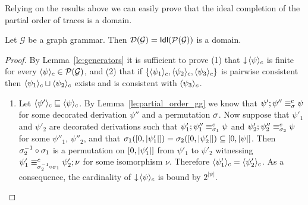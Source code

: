 Relying on the results above we can easily prove that the ideal
completion of the partial order of traces is a domain.

\begin{proposition} 
  \label{pr:domain-gg} 
  Let $\mathcal{G}$ be a graph grammar. Then
  $\dom{\mathcal{G}} =  \ideal{\poset{\mathcal{G}}}$
  is a
  domain.
\end{proposition}

\begin{proof}
  By Lemma~\ref{le:generators}
  it is sufficient to prove 
  (1) that
  $\principal{\ltrace{\psi}}$ is finite for every $\ltrace{\psi} \in
  \poset{\mathcal{G}}$, and (2) that if $\{\ltrace{\psi_1},
  \ltrace{\psi_2},
  \ltrace{\psi_3}\}$ is pairwise consistent then $\ltrace{\psi_1}
  \sqcup
  \ltrace{\psi_2}$ exists and is consistent with $\ltrace{\psi_3}$.


  
  \begin{enumerate}
  
  \item Let $\ltrace{\psi'} \sqsubseteq \ltrace{\psi}$. By
    Lemma~\ref{le:partial_order_gg}
    we know that
    $\psi';\psi'' \equiv^c_{\perm} \psi$ for some decorated derivation
    $\psi''$ and a
    permutation $\perm$.  Now suppose that
    $\psi'_1$ and $\psi'_2$ are decorated derivations such that
    $\psi'_1;\psi''_1 \equiv^c_{\perm_1} \psi$ and
    $\psi'_2;\psi''_2 \equiv^c_{\perm_2} \psi$ for some $\psi''_1$,
    $\psi''_2$, and that
    $\perm_1(\interval[0]{|\psi'_1|}) =
    \perm_2(\interval[0]{|\psi'_2|}) \subseteq
    \interval[0]{|\psi|}$. Then $\perm_2^{-1}\circ \perm_1$ is a
    permutation on $\interval[0]{|\psi'_1|}$ from $\psi'_1$ to
    $\psi'_2$ witnessing $\psi'_1 \equiv^c_{\perm_2^{-1}\circ \perm_1} \psi'_2; \nu$ for some isomorphism $\nu$. 
    Therefore
    $\ltrace{\psi'_1} = \ltrace{\psi'_2}$.  As a consequence, the
    cardinality of $\principal{\ltrace{\psi}}$ is bound by
    $2^{|\psi|}$.
  

\end{enumerate}
\end{proof}
